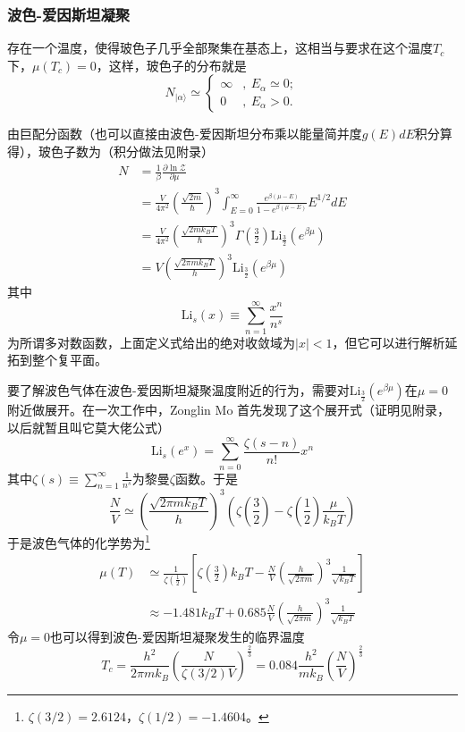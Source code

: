 \documentclass[a4paper,11pt]{ctexart}
\newcommand{\beq}{\begin{equation}}
\newcommand{\eeq}{\end{equation}}
\newcommand{\bea}{\begin{equation}\begin{aligned}}
\newcommand{\eea}{\end{aligned}\end{equation}}
\newcommand{\red}{\color{red}}
\newcommand{\grandz}{\mathcal{Z}}
\newcommand{\Li}[1]{\mathrm{Li}_{#1}}
\begin{document}
\subsubsection{波色-爱因斯坦凝聚}
存在一个温度，使得玻色子几乎全部聚集在基态上，这相当与要求在这个温度$T_c$下，$\mu(T_c) = 0$，这样，玻色子的分布就是
\beq
N_{|\alpha \rangle} \simeq \begin{cases} \infty &,\ E_\alpha \simeq 0; \\ 0&,\ E_\alpha > 0. 
\end{cases}
\eeq
\par
由巨配分函数（也可以直接由波色-爱因斯坦分布乘以能量简并度$g(E)dE$积分算得），玻色子数为（积分做法见附录）
\bea
N &= \frac{1}{\beta} \frac{\partial \ln \grandz}{\partial \mu}\\
&= \frac{V}{4\pi^2} \left(\frac{\sqrt{2m}}{\hbar}\right)^3 \int_{E=0}^\infty \frac{e^{\beta (\mu - E)}}{1 - e^{\beta (\mu - E)}} E^{1/2} dE \\
&= \frac{V}{4\pi^2} \left(\frac{\sqrt{2mk_B T}}{\hbar} \right)^3 \Gamma \left(\frac{3}{2}\right) \Li{\frac{3}{2}} (e^{\beta \mu}) \\
&= V \left(\frac{\sqrt{2\pi m k_B T}}{h}\right)^3 \Li{\frac{3}{2}} (e^{\beta \mu})
\eea
其中
\beq
\Li{s}(x) \equiv \sum_{n=1}^\infty \frac{x^n}{n^s}
\eeq
为所谓多对数函数，上面定义式给出的绝对收敛域为$|x|<1$，但它可以进行解析延拓到整个复平面。\par
要了解波色气体在波色-爱因斯坦凝聚温度附近的行为，需要对$\Li{\frac{3}{2}} (e^{\beta \mu})$在$\mu = 0$附近做展开。{\red 在一次工作中，Zonglin Mo 首先发现了这个展开式}（证明见附录，以后就暂且叫它莫大佬公式）
\beq
\Li{s} (e^x) = \sum_{n=0}^\infty \frac{\zeta(s-n)}{n!} x^n
\eeq
其中$\zeta(s) \equiv \sum_{n=1}^\infty \frac{1}{n^s}$为黎曼$\zeta$函数。于是
\beq
\frac{N}{V} \simeq \left(\frac{\sqrt{2\pi m k_B T}}{h}\right)^3 \left( \zeta \left(\frac{3}{2}\right) -\zeta \left(\frac{1}{2}\right) \frac{\mu}{k_B T}\right)
\eeq
于是波色气体的化学势为\footnote{$\zeta(3/2) = 2.6124$，$\zeta(1/2) = -1.4604$。}
\bea
\mu(T) &\simeq  \frac{1}{\zeta \left(\frac{1}{2}\right)} \left[ \zeta \left(\frac{3}{2}\right) k_B T - \frac{N}{V} \left( \frac{h}{\sqrt{2\pi m}}\right)^3 \frac{1}{\sqrt{k_B T}} \right] \\
&\approx- 1.481 k_B T + 0.685 \frac{N}{V} \left( \frac{h}{\sqrt{2\pi m}}\right)^3 \frac{1}{\sqrt{k_B T}}
\eea
令$\mu = 0$也可以得到波色-爱因斯坦凝聚发生的临界温度
\beq
T_c = \frac{h^2}{2\pi m k_B} \left( \frac{N}{\zeta(3/2)V} \right)^{\frac{2}{3}} = 0.084 \frac{h^2}{mk_B} \left( \frac{N}{V}\right)^{\frac{2}{3}}
\eeq
\end{document}
